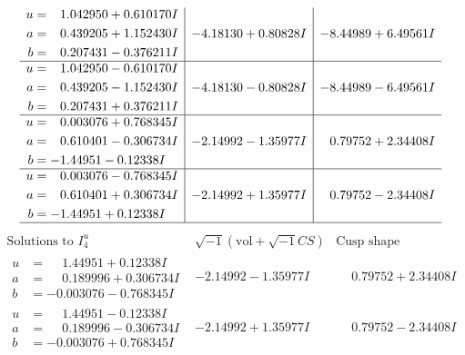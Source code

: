 \documentclass[1p]{elsarticle_modified}
\theoremstyle{definition}
\newcommand{\I}{\sqrt{-1}}
\begin{document}
$$\begin{array}{c|c|c}
\begin{aligned}
u &= \phantom{-}1.042950 + 0.610170 I \\
a &= \phantom{-}0.439205 + 1.152430 I \\
b &= \phantom{-}0.207431 - 0.376211 I\end{aligned}
 & -4.18130 + 0.80828 I & -8.44989 + 6.49561 I \\ \hline\begin{aligned}
u &= \phantom{-}1.042950 - 0.610170 I \\
a &= \phantom{-}0.439205 - 1.152430 I \\
b &= \phantom{-}0.207431 + 0.376211 I\end{aligned}
 & -4.18130 - 0.80828 I & -8.44989 - 6.49561 I \\ \hline\begin{aligned}
u &= \phantom{-}0.003076 + 0.768345 I \\
a &= \phantom{-}0.610401 - 0.306734 I \\
b &= -1.44951 - 0.12338 I\end{aligned}
 & -2.14992 - 1.35977 I & \phantom{-}0.79752 + 2.34408 I \\ \hline\begin{aligned}
u &= \phantom{-}0.003076 - 0.768345 I \\
a &= \phantom{-}0.610401 + 0.306734 I \\
b &= -1.44951 + 0.12338 I\end{aligned}
 & -2.14992 + 1.35977 I & \phantom{-}0.79752 - 2.34408 I\\
 \hline 
 \end{array}$$\newpage$$\begin{array}{c|c|c}  
\text{Solutions to }I^u_{4}& \I (\text{vol} + \sqrt{-1}CS) & \text{Cusp shape}\\
 \hline 
\begin{aligned}
u &= \phantom{-}1.44951 + 0.12338 I \\
a &= \phantom{-}0.189996 + 0.306734 I \\
b &= -0.003076 - 0.768345 I\end{aligned}
 & -2.14992 - 1.35977 I & \phantom{-}0.79752 + 2.34408 I \\ \hline\begin{aligned}
u &= \phantom{-}1.44951 - 0.12338 I \\
a &= \phantom{-}0.189996 - 0.306734 I \\
b &= -0.003076 + 0.768345 I\end{aligned}
 & -2.14992 + 1.35977 I & \phantom{-}0.79752 - 2.34408 I \\ \hline\begin{aligned}

\end{aligned}
\end{array}$$
\end{document}
